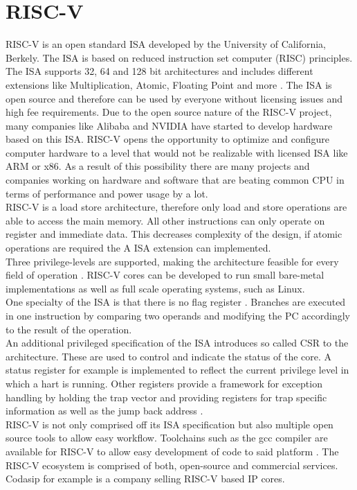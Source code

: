 \section{RISC-V}
RISC-V is an open standard \acf{ISA} developed by the
University of California, Berkely. The ISA is based on reduced instruction set
computer (RISC) principles. The ISA supports 32, 64 and 128 bit architectures and
includes different extensions like Multiplication, Atomic, Floating Point and more \cite{riscv:unprivileged}. The
ISA is open source and therefore can be used by everyone without licensing issues
and high fee requirements. Due to the open source nature of the RISC-V project,
many companies like Alibaba and NVIDIA have started to develop hardware based
on this ISA.
RISC-V opens the opportunity to optimize and configure computer hardware to a
level that would not be realizable with licensed ISA like ARM or x86. As a result of
this possibility there are many projects and companies working on hardware and
software that are beating common CPU in terms of performance and power usage
by a lot.\\
RISC-V is a load store architecture, therefore only load and store operations are able to access the main memory. All other instructions can only operate on register and immediate data. This decreases complexity of the design, if atomic operations are required the A \ac{ISA} extension can implemented.\\
Three privilege-levels are supported, making the architecture feasible for every field of operation \cite{riscv:privileged}. RISC-V cores can be developed to run small bare-metal implementations as well as full scale operating systems, such as Linux.\\
One specialty of the \ac{ISA} is that there is no flag register \cite{riscv:unprivileged}. Branches are executed in one instruction by comparing two operands and modifying the \ac{PC} accordingly to the result of the operation. \\
An additional privileged specification of the \ac{ISA} introduces so called \ac{CSR} to the architecture. These are used to control and indicate the status of the core. A status register for example is implemented to reflect the current privilege level in which a hart is running. Other registers provide a framework for exception handling by holding the trap vector and providing registers for trap specific information as well as the jump back address \cite{riscv:privileged}.\\
RISC-V is not only comprised off its \ac{ISA} specification but also multiple open source tools to allow easy workflow. Toolchains such as the gcc compiler are available for RISC-V to allow easy development of code to said platform \cite{gcc}. The RISC-V ecosystem is comprised of both, open-source and commercial services. Codasip for example is a company selling RISC-V based \ac{IP} cores. 
\clearpage
